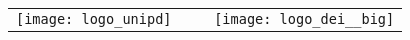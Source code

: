 
\begin{frame}
	\titlepage
	\begin{center}
		\begin{tabular}{ccc}
			\texttt{[image: logo\_unipd]} &
			$~~~$ &
			\texttt{[image: logo\_dei\_\_big]} \\
		\end{tabular}
	\end{center}
	
\end{frame}
